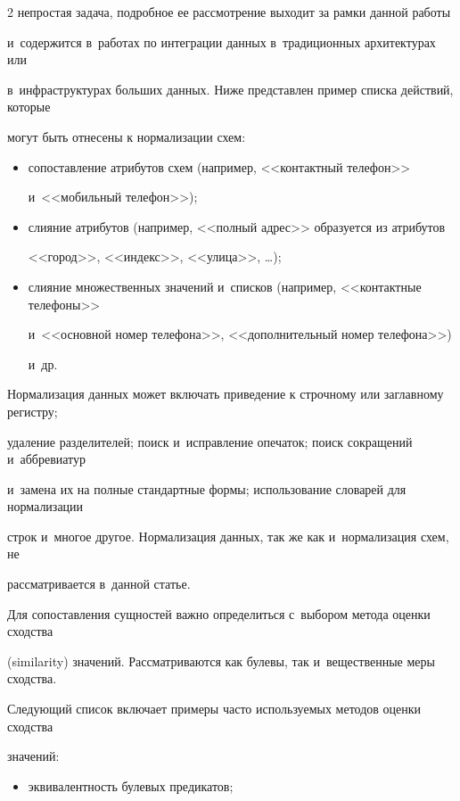 \begin{multicols}{2}
непростая задача, подробное ее рассмотрение выходит за рамки данной работы

и~содержится в~работах по интеграции данных в~традиционных архитектурах или

в~инфраструктурах больших данных. Ниже представлен пример списка действий, которые

могут быть отнесены к нормализации схем:

  \begin{itemize}

\item сопоставление атрибутов схем (например, <<контактный телефон>>

и~<<мобильный телефон>>);

\item слияние атрибутов (например, <<полный адрес>> образуется из атрибутов

<<город>>, <<индекс>>, <<улица>>, \ldots);

\item слияние множественных значений и~списков (например, <<контактные телефоны>>

и~<<основной номер телефона>>, <<дополнительный номер телефона>>)

 и~др.

\end{itemize}



  Нормализация данных может включать приведение к строчному или заглавному регистру;

удаление разделителей; поиск и~исправление опечаток; поиск сокращений и~аббревиатур

и~замена их на полные стандартные формы; использование словарей для нормализации

строк и~многое другое. Нормализация данных, так же как и~нормализация схем, не

рассматривается в~данной статье.



  Для сопоставления сущностей важно определиться с~выбором метода оценки сходства

(similarity) значений. Рассматриваются как булевы, так и~вещественные меры сходства.

Следующий список включает примеры часто используемых методов оценки сходства

значений:

  \begin{itemize}

\item эквивалентность булевых предикатов;\\[-13pt]


\end{itemize}
\end{multicols}
